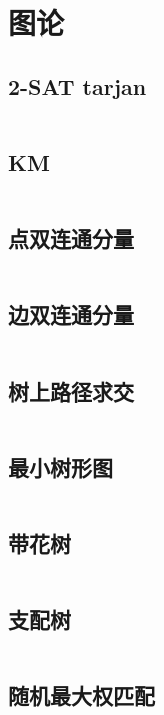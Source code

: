 \section{图论}
\subsection{2-SAT tarjan}
\inputminted{cpp}{\source/graph-theory/2-sat-tarjan.cpp}
\subsection{KM}
\inputminted{cpp}{\source/graph-theory/KM.cpp}
\subsection{点双连通分量}
\inputminted{cpp}{\source/graph-theory/biconnected-graph-vertex.cpp}
\subsection{边双连通分量}
\inputminted{cpp}{\source/graph-theory/biconnected-graph-edge.cpp}
\subsection{树上路径求交}
\inputminted{cpp}{\source/graph-theory/path-intersection.cpp}
\subsection{最小树形图}
\inputminted{cpp}{\source/graph-theory/optimum-branching.cpp}
\subsection{带花树}
\inputminted{cpp}{\source/graph-theory/blossom-algorithm.cpp}
\subsection{支配树}
\inputminted{cpp}{\source/graph-theory/dominator-tree.cpp}
\subsection{随机最大权匹配}
\inputminted{cpp}{\source/graph-theory/general.cpp}
